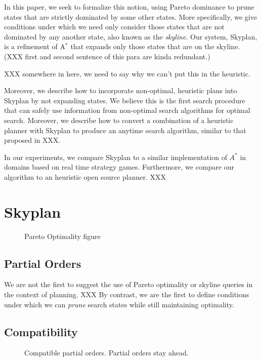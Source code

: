 \documentclass[letterpaper]{article}
\begin{document}
In this paper, we seek to formalize this notion, using Pareto
dominance to prune states that are strictly dominated by some other
states. More specifically, we give conditions under which we need
only consider those states that are not dominated by any another
state, also known as the \textit{skyline}. Our system, Skyplan, is
a refinement of A$^*$ that expands only those states that are on
the skyline. (XXX first and second sentence of this para are kinda
redundant.)

XXX somewhere in here, we need to say why we can't put this in the heuristic.

Moreover, we describe how to incorporate non-optimal, heuristic
plans into Skyplan by not expanding states.  We believe this is the
first search procedure that can safely use information from non-optimal
search algorithms for optimal search. Moreover, we describe how to
convert a combination of a heuristic planner with Skyplan to produce
an anytime search algorithm, similar to that proposed in XXX.

In our experiments, we compare Skyplan to a similar implementation of $A^*$
in domains based on real time strategy games. Furthermore, we compare
our algorithm to an heuristic open source planner. XXX

\section{Skyplan}

\begin{figure}
  \caption{Pareto Optimality figure}
\end{figure}

\subsection{Partial Orders}

We are not the first to suggest the use of Pareto optimality or skyline queries
in the context of planning. XXX By contrast, we are the first to define conditions
under which we can \textit{prune} search states while still maintaining optimality.

\subsection{Compatibility}
\begin{figure}
  \caption{Compatible partial orders. Partial orders stay ahead.}
\end{figure}
\end{document}

